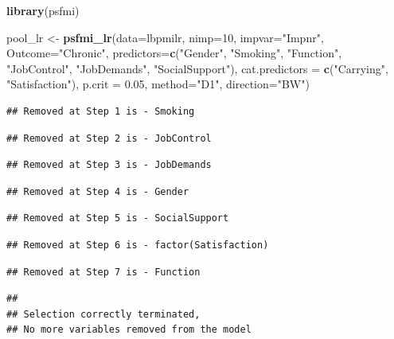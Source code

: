 \documentclass[
]{book}
\newenvironment{Shaded}{\begin{snugshade}}{\end{snugshade}}
\newcommand{\DataTypeTok}[1]{\textcolor[rgb]{0.13,0.29,0.53}{#1}}
\newcommand{\DecValTok}[1]{\textcolor[rgb]{0.00,0.00,0.81}{#1}}
\newcommand{\FloatTok}[1]{\textcolor[rgb]{0.00,0.00,0.81}{#1}}
\newcommand{\KeywordTok}[1]{\textcolor[rgb]{0.13,0.29,0.53}{\textbf{#1}}}
\newcommand{\NormalTok}[1]{#1}
\newcommand{\StringTok}[1]{\textcolor[rgb]{0.31,0.60,0.02}{#1}}
\begin{document}
\begin{Shaded}
\begin{Highlighting}[]
\KeywordTok{library}\NormalTok{(psfmi)}

\NormalTok{pool_lr <-}\StringTok{ }\KeywordTok{psfmi_lr}\NormalTok{(}\DataTypeTok{data=}\NormalTok{lbpmilr, }\DataTypeTok{nimp=}\DecValTok{10}\NormalTok{, }\DataTypeTok{impvar=}\StringTok{"Impnr"}\NormalTok{, }\DataTypeTok{Outcome=}\StringTok{"Chronic"}\NormalTok{,}
  \DataTypeTok{predictors=}\KeywordTok{c}\NormalTok{(}\StringTok{"Gender"}\NormalTok{, }\StringTok{"Smoking"}\NormalTok{, }\StringTok{"Function"}\NormalTok{, }\StringTok{"JobControl"}\NormalTok{, }\StringTok{"JobDemands"}\NormalTok{,}
  \StringTok{"SocialSupport"}\NormalTok{), }\DataTypeTok{cat.predictors =} \KeywordTok{c}\NormalTok{(}\StringTok{"Carrying"}\NormalTok{, }\StringTok{"Satisfaction"}\NormalTok{), }
  \DataTypeTok{p.crit =} \FloatTok{0.05}\NormalTok{, }\DataTypeTok{method=}\StringTok{"D1"}\NormalTok{, }\DataTypeTok{direction=}\StringTok{"BW"}\NormalTok{)}
\end{Highlighting}
\end{Shaded}

\begin{verbatim}
## Removed at Step 1 is - Smoking
\end{verbatim}

\begin{verbatim}
## Removed at Step 2 is - JobControl
\end{verbatim}

\begin{verbatim}
## Removed at Step 3 is - JobDemands
\end{verbatim}

\begin{verbatim}
## Removed at Step 4 is - Gender
\end{verbatim}

\begin{verbatim}
## Removed at Step 5 is - SocialSupport
\end{verbatim}

\begin{verbatim}
## Removed at Step 6 is - factor(Satisfaction)
\end{verbatim}

\begin{verbatim}
## Removed at Step 7 is - Function
\end{verbatim}

\begin{verbatim}
## 
## Selection correctly terminated, 
## No more variables removed from the model
\end{verbatim}
\end{document}
